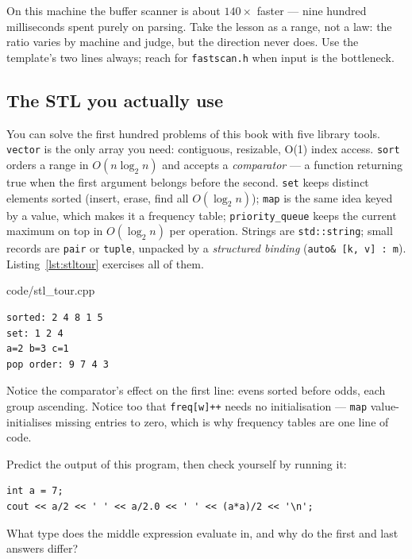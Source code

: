On this machine the buffer scanner is about $140\times$ faster --- nine
hundred milliseconds spent purely on parsing. Take the lesson as a range, not
a law: the ratio varies by machine and judge, but the direction never does.
Use the template's two lines always; reach for \texttt{fastscan.h} when input
is the bottleneck.

\subsection{The STL you actually use}\label{sec:stl}

You can solve the first hundred problems of this book with five library
tools. \texttt{vector} is the only array you need: contiguous, resizable,
O(1) index access. \texttt{sort} orders a range in $O(n\log_2 n)$ and accepts
a \emph{comparator} --- a function returning true when the
first argument belongs before the second. \texttt{set}
keeps distinct elements sorted (insert, erase, find all $O(\log_2 n)$);
\texttt{map} is the same idea keyed by a value, which
makes it a frequency table; \texttt{priority\_queue}
keeps the current maximum on top in $O(\log_2 n)$ per operation. Strings are
\texttt{std::string}; small records are \texttt{pair} or \texttt{tuple},
unpacked by a \emph{structured binding}
(\texttt{auto\& [k, v] : m}). Listing~\ref{lst:stltour} exercises all of them.


{code/stl_tour.cpp}

\begin{lstlisting}[numbers=none]
sorted: 2 4 8 1 5
set: 1 2 4
a=2 b=3 c=1 
pop order: 9 7 4 3
\end{lstlisting}

Notice the comparator's effect on the first line: evens sorted before odds,
each group ascending. Notice too that \texttt{freq[w]++} needs no
initialisation --- \texttt{map} value-initialises missing entries to zero,
which is why frequency tables are one line of code.

\begin{exercise}[easy]\label{exr:predict}
Predict the output of this program, then check yourself by running it:
\begin{lstlisting}
int a = 7;
cout << a/2 << ' ' << a/2.0 << ' ' << (a*a)/2 << '\n';
\end{lstlisting}
What type does the middle expression evaluate in, and why do the first and
last answers differ?
\end{exercise}

